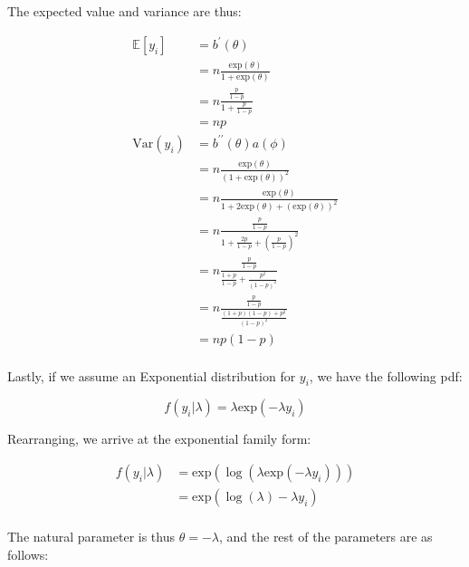 \documentclass{report}
\begin{document}
The expected value and variance are thus:

\begin{equation}\label{eq:ex-glm-binomial-dist-mean-var}
    \begin{aligned}
        \mathbb{E}[y_i]
          &= b^\prime(\theta) \\
          &= n \frac{\text{exp}(\theta)}{1 + \text{exp}(\theta)} \\
          &= n \frac{\frac{p}{1-p}}{1 + \frac{p}{1-p}} \\
          &= np \\
        \text{Var}(y_i)
          &= b^{\prime\prime}(\theta)a(\phi) \\
          &= n \frac{\text{exp}(\theta)}{(1 + \text{exp}(\theta))^2} \\
          &= n \frac{\text{exp}(\theta)}{1 + 2\text{exp}(\theta) + (\text{exp}(\theta))^2} \\
          &= n \frac{\frac{p}{1-p}}{1 + \frac{2p}{1-p} + \left(\frac{p}{1-p}\right)^2} \\
          &= n \frac{\frac{p}{1-p}}{\frac{1+p}{1-p} + \frac{p^2}{(1-p)^2}} \\
          &= n \frac{\frac{p}{1-p}}{\frac{(1+p)(1-p) + p^2}{(1-p)^2}} \\
          &= np(1-p) \\
    \end{aligned}
\end{equation}

Lastly, if we assume an Exponential distribution for $y_i$, we have the following \gls{pdf}:

\begin{equation}\label{eq:ex-glm-excponential-dist}
    f(y_i|\lambda) = \lambda\text{exp}(-\lambda y_i)
\end{equation}

Rearranging, we arrive at the exponential family form:

\begin{equation}\label{eq:ex-glm-exponential-dist-exp-form}
    \begin{aligned}
        f(y_i|\lambda)
          &= \text{exp}(\log(\lambda\text{exp}(-\lambda y_i))) \\
          &= \text{exp}(\log(\lambda) - \lambda y_i) \\
    \end{aligned}
\end{equation}

The natural parameter is thus $\theta = -\lambda$, and the rest of the parameters are as follows:
\end{document}
